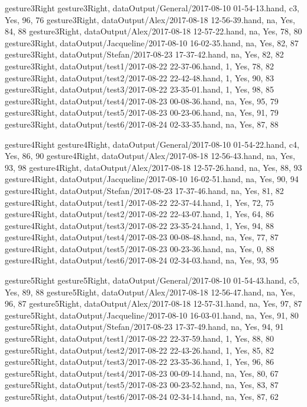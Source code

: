 gesture3Right
gesture3Right, dataOutput/General/2017-08-10 01-54-13.hand, c3, Yes, 96, 76
gesture3Right, dataOutput/Alex/2017-08-18 12-56-39.hand, na, Yes, 84, 88
gesture3Right, dataOutput/Alex/2017-08-18 12-57-22.hand, na, Yes, 78, 80
gesture3Right, dataOutput/Jacqueline/2017-08-10 16-02-35.hand, na, Yes, 82, 87
gesture3Right, dataOutput/Stefan/2017-08-23 17-37-42.hand, na, Yes, 82, 82
gesture3Right, dataOutput/test1/2017-08-22 22-37-06.hand, 1, Yes, 78, 82
gesture3Right, dataOutput/test2/2017-08-22 22-42-48.hand, 1, Yes, 90, 83
gesture3Right, dataOutput/test3/2017-08-22 23-35-01.hand, 1, Yes, 98, 85
gesture3Right, dataOutput/test4/2017-08-23 00-08-36.hand, na, Yes, 95, 79
gesture3Right, dataOutput/test5/2017-08-23 00-23-06.hand, na, Yes, 91, 79
gesture3Right, dataOutput/test6/2017-08-24 02-33-35.hand, na, Yes, 87, 88

gesture4Right
gesture4Right, dataOutput/General/2017-08-10 01-54-22.hand, c4, Yes, 86, 90
gesture4Right, dataOutput/Alex/2017-08-18 12-56-43.hand, na, Yes, 93, 98
gesture4Right, dataOutput/Alex/2017-08-18 12-57-26.hand, na, Yes, 88, 93
gesture4Right, dataOutput/Jacqueline/2017-08-10 16-02-51.hand, na, Yes, 90, 94
gesture4Right, dataOutput/Stefan/2017-08-23 17-37-46.hand, na, Yes, 81, 82
gesture4Right, dataOutput/test1/2017-08-22 22-37-44.hand, 1, Yes, 72, 75
gesture4Right, dataOutput/test2/2017-08-22 22-43-07.hand, 1, Yes, 64, 86
gesture4Right, dataOutput/test3/2017-08-22 23-35-24.hand, 1, Yes, 94, 88
gesture4Right, dataOutput/test4/2017-08-23 00-08-48.hand, na, Yes, 77, 87
gesture4Right, dataOutput/test5/2017-08-23 00-23-36.hand, na, Yes, 0, 88
gesture4Right, dataOutput/test6/2017-08-24 02-34-03.hand, na, Yes, 93, 95

gesture5Right
gesture5Right, dataOutput/General/2017-08-10 01-54-43.hand, c5, Yes, 89, 88
gesture5Right, dataOutput/Alex/2017-08-18 12-56-47.hand, na, Yes, 96, 87
gesture5Right, dataOutput/Alex/2017-08-18 12-57-31.hand, na, Yes, 97, 87
gesture5Right, dataOutput/Jacqueline/2017-08-10 16-03-01.hand, na, Yes, 91, 80
gesture5Right, dataOutput/Stefan/2017-08-23 17-37-49.hand, na, Yes, 94, 91
gesture5Right, dataOutput/test1/2017-08-22 22-37-59.hand, 1, Yes, 88, 80
gesture5Right, dataOutput/test2/2017-08-22 22-43-26.hand, 1, Yes, 85, 82
gesture5Right, dataOutput/test3/2017-08-22 23-35-36.hand, 1, Yes, 96, 86
gesture5Right, dataOutput/test4/2017-08-23 00-09-14.hand, na, Yes, 80, 67
gesture5Right, dataOutput/test5/2017-08-23 00-23-52.hand, na, Yes, 83, 87
gesture5Right, dataOutput/test6/2017-08-24 02-34-14.hand, na, Yes, 87, 62

